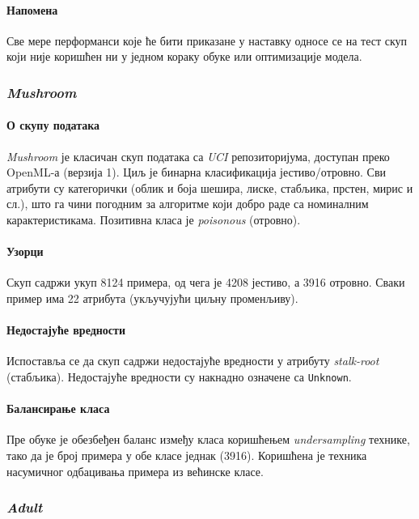 \paragraph{Напомена} Све мере перформанси које ће бити приказане у наставку односе се на тест скуп који није коришћен ни у једном кораку обуке или оптимизације модела.
 
\subsubsection{\emph{Mushroom}}

\paragraph {О скупу података} \emph{Mushroom} је класичан скуп података са \emph{UCI} репозиторијума, доступан преко OpenML-а (верзија 1). Циљ је бинарна класификација јестиво/отровно. Сви атрибути су категорички (облик и боја шешира, лиске, стабљика, прстен, мирис и сл.), што га чини погодним за алгоритме који добро раде са номиналним карактеристикама. Позитивна класа је \textit{poisonous} (отровно).


\paragraph{Узорци} Скуп садржи укуп 8124 примера, од чега је 4208 јестиво, а 3916 отровно. Сваки пример има 22 атрибута (укључујући циљну променљиву).

\paragraph{Недостајуће вредности} Испоставља се да скуп садржи недостајуће вредности у атрибуту \textit{stalk-root} (стабљика). Недостајуће вредности су накнадно означене са \texttt{Unknown}.

\paragraph{Балансирање класа} Пре обуке је обезбеђен баланс између класа коришћењем \textit{undersampling} технике, тако да је број примера у обе класе једнак (3916). Коришћена је техника насумичног одбацивања примера из већинске класе.

\subsubsection{\emph{Adult}}

